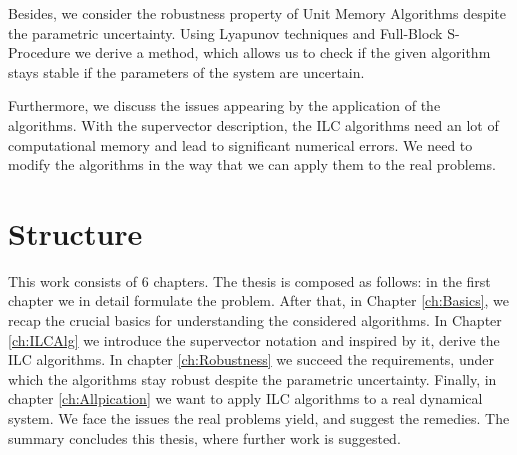 Besides, we consider the robustness property of Unit Memory Algorithms despite the parametric uncertainty. Using Lyapunov techniques and 
Full-Block S-Procedure we derive a method, which allows us to check if the given algorithm stays stable if the parameters of the system are uncertain. 

Furthermore, we discuss the issues appearing by the application of the algorithms. With the supervector description, the ILC algorithms need an lot of computational memory and lead to significant numerical errors. We need to modify the algorithms in the way that we can apply them to the real problems.

\section{Structure}

This work consists of 6 chapters. The thesis is composed as follows: in the first chapter we in detail formulate the problem. 
After that, in Chapter \ref{ch:Basics}, we recap the crucial basics for understanding the considered algorithms. In Chapter \ref{ch:ILCAlg}  we introduce the supervector notation and inspired by it, derive the ILC algorithms. In chapter \ref{ch:Robustness} we succeed the requirements, under which the algorithms stay robust despite the parametric uncertainty. Finally, in chapter \ref{ch:Allpication} we want to apply ILC algorithms to a real dynamical system. We face the issues the real problems yield, and suggest the remedies. The summary concludes this thesis, where further work is suggested. 










 



 


 


 





 
